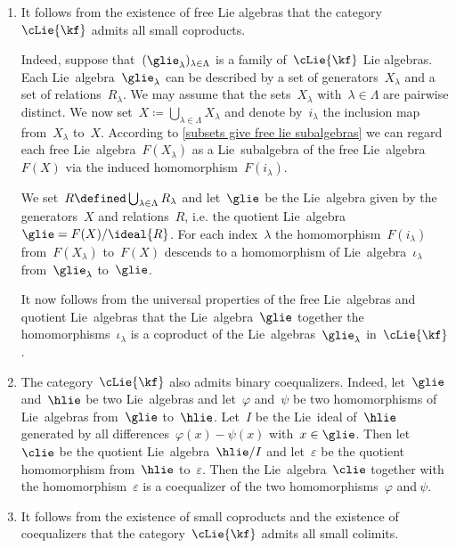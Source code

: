 \begin{remark}
	\label{existence of small colimits}
	\leavevmode
	\begin{enumerate}
		\item
			It follows from the existence of free Lie algebras that the category~$\cLie{\kf}$ admits all small coproducts.

			Indeed, suppose that~$(\glie_\lambda)_{\lambda \in \Lambda}$ is a family of~$\cLie{\kf}$ Lie algebras.
			Each Lie~algebra~$\glie_\lambda$ can be described by a set of generators~$X_\lambda$ and a set of relations~$R_\lambda$.
			We may assume that the sets~$X_\lambda$ with~$\lambda \in \Lambda$ are pairwise distinct.
			We now set~$X \coloneqq \bigcup_{\lambda \in \Lambda} X_\lambda$ and denote by~$i_\lambda$ the inclusion map from~$X_\lambda$ to~$X$.
			According to \cref{subsets give free lie subalgebras} we can regard each free Lie~algebra~$F(X_\lambda)$ as a Lie~subalgebra of the free Lie~algebra~$F(X)$ via the induced homomorphism~$F(i_\lambda)$.

			We set~$R \defined \bigcup_{\lambda \in \Lambda} R_\lambda$ and let~$\glie$ be the Lie~algebra given by the generators~$X$ and relations~$R$, i.e. the quotient Lie~algebra~$\glie = F(X) / \ideal{ R }$.
			For each index~$\lambda$ the homomorphism~$F(i_\lambda)$ from~$F(X_\lambda)$ to~$F(X)$ descends to a homomorphism of Lie~algebra~$\iota_\lambda$ from~$\glie_\lambda$ to~$\glie$.

			It now follows from the universal properties of the free Lie~algebras and quotient Lie~algebras that the Lie~algebra~$\glie$ together the homomorphisms~$\iota_\lambda$ is a coproduct of the Lie~algebras~$\glie_\lambda$ in~$\cLie{\kf}$.
		\item
			The category~$\cLie{\kf}$ also admits binary coequalizers.
			Indeed, let~$\glie$ and~$\hlie$ be two Lie~algebras and let~$\varphi$ and~$\psi$ be two homomorphisms of Lie~algebras from~$\glie$ to~$\hlie$.
			Let~$I$ be the Lie~ideal of~$\hlie$ generated by all differences~$\varphi(x) - \psi(x)$ with~$x \in \glie$.
			Then let~$\clie$ be the quotient Lie~algebra~$\hlie / I$ and let~$\varepsilon$ be the quotient homomorphism from~$\hlie$ to~$\varepsilon$.
			Then the Lie~algebra~$\clie$ together with the homomorphism~$\varepsilon$ is a coequalizer of the two homomorphisms~$\varphi$ and$~\psi$.
		\item
			It follows from the existence of small coproducts and the existence of coequalizers that the category~$\cLie{\kf}$ admits all small colimits.
	\end{enumerate}
\end{remark}




